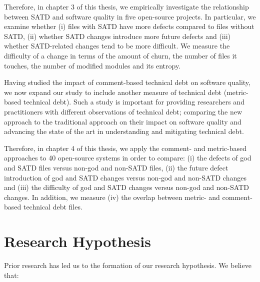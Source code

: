 Therefore, in chapter 3 of this thesis, we empirically investigate the relationship between SATD and software quality in five open-source projects. In particular, we examine whether (i) files with SATD have more defects compared to files without SATD, (ii) whether SATD changes introduce more future defects and (iii) whether SATD-related changes tend to be more difficult. We measure the difficulty of a change in terms of the amount of churn, the number of files it touches, the number of modified modules and its entropy. \par

Having studied the impact of comment-based technical debt on software quality, we now expand our study to include another measure of technical debt (metric-based technical debt). Such a study is important for providing researchers and practitioners with different observations of technical debt; comparing the new approach to the traditional approach on their impact on software quality and advancing the state of the art in understanding and mitigating technical debt.\par


Therefore, in chapter 4 of this thesis, we apply the comment- and metric-based approaches to 40 open-source systems in order to compare: (i) the defects of god and SATD files versus non-god and non-SATD files, (ii) the future defect introduction of god and SATD changes versus non-god and non-SATD changes and (iii) the difficulty of god and SATD changes versus non-god and non-SATD changes. In addition, we measure (iv) the overlap between metric- and comment-based technical debt files.




\section{Research Hypothesis}
Prior research has led us to the formation of our research hypothesis. We believe that:

 
